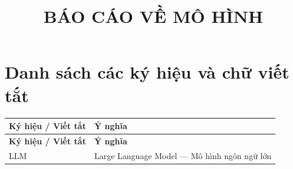\documentclass[oneside]{hcmus-report}
\title{BÁO CÁO VỀ MÔ HÌNH}
\begin{document}
\coverpage%

\tableofcontents

\clearpage
{}
{}
\listoffigures

\clearpage
{}
{}
\listoftables


\clearpage
{}
\section*{Danh sách các ký hiệu và chữ viết tắt}

\begin{longtable}{p{} p{}}
\textbf{Ký hiệu / Viết tắt} & \textbf{Ý nghĩa} \\
\hline
\endfirsthead
\textbf{Ký hiệu / Viết tắt} & \textbf{Ý nghĩa} \\
\hline
\endhead

LLM        & Large Language Model --- Mô hình ngôn ngữ lớn \\

\end{longtable}


\clearpage








\clearpage

{}



\nocite{*}
\end{document}
